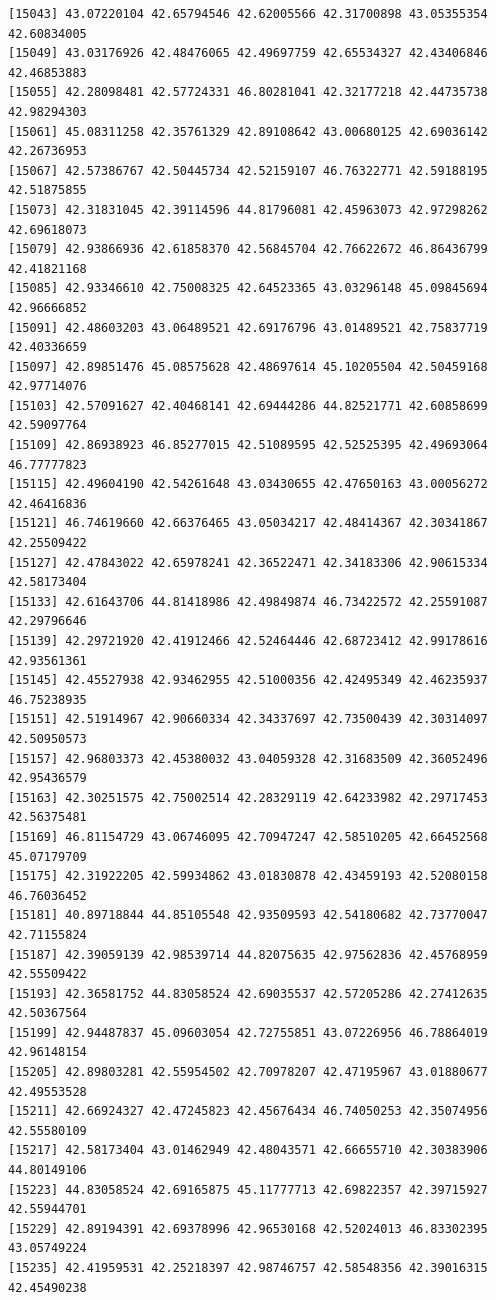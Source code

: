 \documentclass[
  letterpaper,
  DIV=11,
  numbers=noendperiod]{scrartcl}
\begin{document}
\begin{verbatim}
[15043] 43.07220104 42.65794546 42.62005566 42.31700898 43.05355354 42.60834005
[15049] 43.03176926 42.48476065 42.49697759 42.65534327 42.43406846 42.46853883
[15055] 42.28098481 42.57724331 46.80281041 42.32177218 42.44735738 42.98294303
[15061] 45.08311258 42.35761329 42.89108642 43.00680125 42.69036142 42.26736953
[15067] 42.57386767 42.50445734 42.52159107 46.76322771 42.59188195 42.51875855
[15073] 42.31831045 42.39114596 44.81796081 42.45963073 42.97298262 42.69618073
[15079] 42.93866936 42.61858370 42.56845704 42.76622672 46.86436799 42.41821168
[15085] 42.93346610 42.75008325 42.64523365 43.03296148 45.09845694 42.96666852
[15091] 42.48603203 43.06489521 42.69176796 43.01489521 42.75837719 42.40336659
[15097] 42.89851476 45.08575628 42.48697614 45.10205504 42.50459168 42.97714076
[15103] 42.57091627 42.40468141 42.69444286 44.82521771 42.60858699 42.59097764
[15109] 42.86938923 46.85277015 42.51089595 42.52525395 42.49693064 46.77777823
[15115] 42.49604190 42.54261648 43.03430655 42.47650163 43.00056272 42.46416836
[15121] 46.74619660 42.66376465 43.05034217 42.48414367 42.30341867 42.25509422
[15127] 42.47843022 42.65978241 42.36522471 42.34183306 42.90615334 42.58173404
[15133] 42.61643706 44.81418986 42.49849874 46.73422572 42.25591087 42.29796646
[15139] 42.29721920 42.41912466 42.52464446 42.68723412 42.99178616 42.93561361
[15145] 42.45527938 42.93462955 42.51000356 42.42495349 42.46235937 46.75238935
[15151] 42.51914967 42.90660334 42.34337697 42.73500439 42.30314097 42.50950573
[15157] 42.96803373 42.45380032 43.04059328 42.31683509 42.36052496 42.95436579
[15163] 42.30251575 42.75002514 42.28329119 42.64233982 42.29717453 42.56375481
[15169] 46.81154729 43.06746095 42.70947247 42.58510205 42.66452568 45.07179709
[15175] 42.31922205 42.59934862 43.01830878 42.43459193 42.52080158 46.76036452
[15181] 40.89718844 44.85105548 42.93509593 42.54180682 42.73770047 42.71155824
[15187] 42.39059139 42.98539714 44.82075635 42.97562836 42.45768959 42.55509422
[15193] 42.36581752 44.83058524 42.69035537 42.57205286 42.27412635 42.50367564
[15199] 42.94487837 45.09603054 42.72755851 43.07226956 46.78864019 42.96148154
[15205] 42.89803281 42.55954502 42.70978207 42.47195967 43.01880677 42.49553528
[15211] 42.66924327 42.47245823 42.45676434 46.74050253 42.35074956 42.55580109
[15217] 42.58173404 43.01462949 42.48043571 42.66655710 42.30383906 44.80149106
[15223] 44.83058524 42.69165875 45.11777713 42.69822357 42.39715927 42.55944701
[15229] 42.89194391 42.69378996 42.96530168 42.52024013 46.83302395 43.05749224
[15235] 42.41959531 42.25218397 42.98746757 42.58548356 42.39016315 42.45490238

\end{verbatim}
\end{document}
